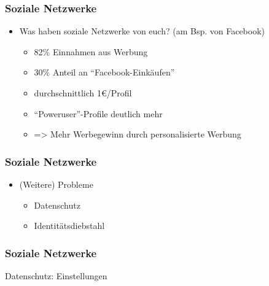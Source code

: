 \documentclass[12pt]{beamer}
\begin{document}
\begin{frame}
  \frametitle{Soziale Netzwerke}

  \begin{itemize}
    \item Was haben soziale Netzwerke von euch? (am Bsp. von Facebook)
      \begin{itemize}
        \item<2-> 82\% Einnahmen aus Werbung
        \item<3-> 30\% Anteil an "`Facebook-Einkäufen"'
        \item<4-> durchschnittlich 1€/Profil
        \item<5-> "`Poweruser"'-Profile deutlich mehr
        \item<6-> => Mehr Werbegewinn durch personalisierte Werbung
      \end{itemize}
  \end{itemize}
\end{frame}

\begin{frame}
  \frametitle{Soziale Netzwerke}

  \begin{itemize}
    \item (Weitere) Probleme
      \begin{itemize}
        \item Datenschutz
        \item Identitätsdiebstahl
      \end{itemize}
  \end{itemize}
\end{frame}

\begin{frame}
  \frametitle{Soziale Netzwerke}

  \begin{center} \Large
    Datenschutz: Einstellungen 
  \end{center}
\end{frame}
\end{document}
